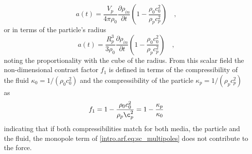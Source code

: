 \begin{equation}\label{intro.arf.eq:a_field_Vp}
    a(t) = \frac{V_p}{4\pi\rho_0}\frac{\partial\rho_{in}}{\partial t}\left(1-\frac{\rho_0c_0^2}{\rho_pc_p^2}\right)\quad,
\end{equation}
or in terms of the particle's radius  
\begin{equation}\label{intro.arf.eq:a_field_Rp}
    a(t) = \frac{R_p^3}{3\rho_0}\frac{\partial\rho_{in}}{\partial t}\left(1-\frac{\rho_0c_0^2}{\rho_pc_p^2}\right)\quad,
\end{equation}
noting the proportionality with the cube of the radius. From this scalar field the non-dimensional contrast factor $f_1$ is defined in terms of the compressibility of the fluid $\kappa_0 = 1/(\rho_0c_0^2)$ and the compressibility of the particle $\kappa_p = 1/(\rho_pc_p^2)$ as
\begin{equation}\label{intro.arf.eq:f1}
    f_1 = 1-\frac{\rho_0 c_0^2}{\rho_p\c_p^2} = 1-\frac{\kappa_p}{\kappa_0}
\end{equation}
indicating that if both compressibilities match for both media, the particle and the fluid, the monopole term of \eqref{intro.arf.eq:sc_multipoles} does not contribute to the force. 

